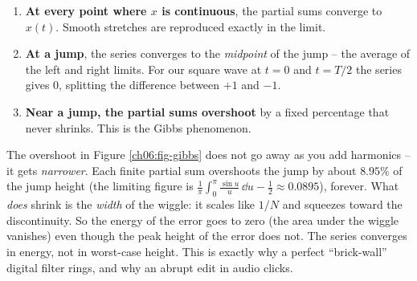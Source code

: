 \begin{enumerate}
\item \textbf{At every point where \(x\) is continuous}, the partial sums converge to
\(x(t)\). Smooth stretches are reproduced exactly in the limit.
\item \textbf{At a jump}, the series converges to the \emph{midpoint} of the jump --
the average of the left and right limits. For our square wave at \(t=0\) and \(t=T/2\)
the series gives \(0\), splitting the difference between \(+1\) and \(-1\).
\item \textbf{Near a jump, the partial sums overshoot} by a fixed percentage that never
shrinks. This is the Gibbs phenomenon.
\end{enumerate}

\begin{happeningbox}
The overshoot in Figure \ref{ch06:fig-gibbs} does not go away as you add harmonics -- it
gets \emph{narrower}. Each finite partial sum overshoots the jump by about
\(8.95\%\) of the jump height (the limiting figure is
\(\frac{1}{\pi}\int_0^\pi\frac{\sin u}{u}\,\dd u - \frac{1}{2} \approx 0.0895\)), forever. What
\emph{does} shrink is the \emph{width} of the wiggle: it scales like \(1/N\) and squeezes
toward the discontinuity. So the energy of the error goes to zero (the area under the
wiggle vanishes) even though the peak height of the error does not. The series converges in energy,
not in worst-case height. This is exactly why a perfect ``brick-wall'' digital filter rings,
and why an abrupt edit in audio clicks.
\end{happeningbox}

